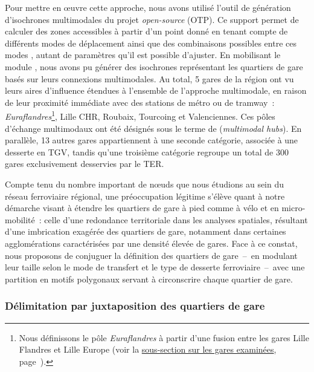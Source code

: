 \begin{refsegment}
Pour mettre en œuvre cette approche, nous avons utilisé l’outil de génération d’isochrones multimodales du projet \textsl{open-source}  (OTP). Ce support permet de calculer des zones accessibles à partir d’un point donné en tenant compte de différents modes de déplacement ainsi que des combinaisons possibles entre ces modes \textcolor{blue}{\autocite[15]{krismer_enhancing_2017}}, autant de paramètres qu'il est possible d'ajuster. En mobilisant le module , nous avons pu générer des isochrones représentant les quartiers de gare basés sur leurs connexions multimodales. Au total, 5 gares de la région ont vu leurs aires d’influence étendues à l’ensemble de l'approche multimodale, en raison de leur proximité immédiate avec des stations de métro ou de tramway~: \textsl{Euraflandres}\footnote{
    Nous définissons le pôle \textsl{Euraflandres} à partir d'une fusion entre les gares Lille Flandres et Lille Europe (voir la \hyperref[chap3:observation-quantitative-gares-examinees]{sous-section sur les gares examinées}, page~\pageref{chap3:observation-quantitative-gares-examinees}).
}, Lille CHR, Roubaix, Tourcoing et Valenciennes. Ces pôles d’échange multimodaux ont été désignés sous le terme de  (\textsl{multimodal hubs}). En parallèle, 13 autres gares appartiennent à une seconde catégorie, associée à une desserte en \acrshort{TGV}, tandis qu’une troisième catégorie regroupe un total de 300 gares exclusivement desservies par le \acrshort{TER}.%

Compte tenu du nombre important de nœuds que nous étudions au sein du réseau ferroviaire régional, une préoccupation légitime s'élève quant à notre démarche visant à étendre les quartiers de gare à pied comme à vélo et en micro-mobilité~: celle d'une redondance territoriale dans les analyses spatiales, résultant d'une imbrication exagérée des quartiers de gare, notamment dans certaines agglomérations caractérisées par une densité élevée de gares. Face à ce constat, nous proposons de conjuguer la définition des quartiers de gare~–~en modulant leur taille selon le mode de transfert et le type de desserte ferroviaire~–~avec une partition en motifs polygonaux servant à circonscrire chaque quartier de gare.%

\subsubsection*{Délimitation par juxtaposition des quartiers de gare
    \label{chap3:quartiers-gare-voronoi}
    }


\end{refsegment}
